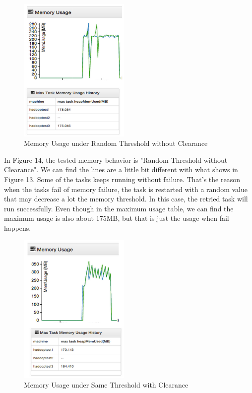 \begin{figure}[ht]
  \centering
    \includegraphics[width=2.1in]{image/test1b.png}
    \caption{Memory Usage under Random Threshold without Clearance}
    \label{ref:memory_allocation}
\end{figure}

In Figure 14, the tested memory behavior is "Random Threshold without Clearance". We can find the lines are a little bit different with what shows in Figure 13. Some of the tasks keeps running without failure. That's the reason when the tasks fail of memory failure, the task is restarted with a random value that may decrease a lot the memory threshold. In this case, the retried task will run successfully. Even though in the maximum usage table, we can find the maximum usage is also about 175MB, but that is just the usage when fail happens.

\begin{figure}[ht]
  \centering
    \includegraphics[width=2.1in]{image/test1c.png}
    \caption{Memory Usage under Same Threshold with Clearance}
    \label{ref:memory_allocation}
\end{figure}

